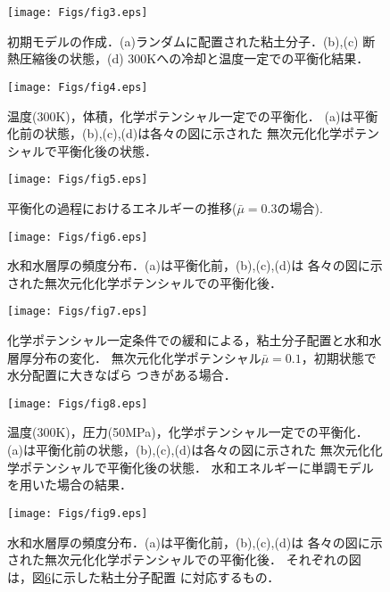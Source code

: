 \begin{figure}[h]
	\begin{center}
	\texttt{[image: Figs/fig3.eps]} 
	\end{center}
	\caption{
		初期モデルの作成．(a)ランダムに配置された粘土分子．(b),(c) 断熱圧縮後の状態，(d)
		300Kへの冷却と温度一定での平衡化結果．
	} 
	\label{fig:fig3}
\end{figure}
\begin{figure}[h]
	\begin{center}
	\texttt{[image: Figs/fig4.eps]} 
	\end{center}
	\caption{
		温度(300K)，体積，化学ポテンシャル一定での平衡化．
		(a)は平衡化前の状態，(b),(c),(d)は各々の図に示された
		無次元化化学ポテンシャルで平衡化後の状態．
	} 
	\label{fig:fig4}
\end{figure}
\begin{figure}[h]
	\begin{center}
	\texttt{[image: Figs/fig5.eps]} 
	\end{center}
	\caption{
		平衡化の過程におけるエネルギーの推移($\bar{\mu}=0.3の場合$).
	} 
	\label{fig:fig5}
\end{figure}
\begin{figure}[h]
	\begin{center}
	\texttt{[image: Figs/fig6.eps]} 
	\end{center}
	\caption{
		水和水層厚の頻度分布．(a)は平衡化前，(b),(c),(d)は
		各々の図に示された無次元化化学ポテンシャルでの平衡化後．
	} 
	\label{fig:fig6}
\end{figure}
\begin{figure}[h]
	\begin{center}
	\texttt{[image: Figs/fig7.eps]} 
	\end{center}
	\caption{
		化学ポテンシャル一定条件での緩和による，粘土分子配置と水和水層厚分布の変化．
		無次元化化学ポテンシャル$\bar{\mu}=0.1$，初期状態で水分配置に大きなばら
		つきがある場合．
	} 
	\label{fig:fig7}
\end{figure}
\begin{figure}[h]
	\begin{center}
	\texttt{[image: Figs/fig8.eps]} 
	\end{center}
	\caption{
		温度(300K)，圧力(50MPa)，化学ポテンシャル一定での平衡化．
		(a)は平衡化前の状態，(b),(c),(d)は各々の図に示された
		無次元化化学ポテンシャルで平衡化後の状態．
		水和エネルギーに単調モデルを用いた場合の結果．
	} 
	\label{fig:fig8}
\end{figure}
\begin{figure}[h]
	\begin{center}
	\texttt{[image: Figs/fig9.eps]} 
	\end{center}
	\caption{
		水和水層厚の頻度分布．(a)は平衡化前，(b),(c),(d)は
		各々の図に示された無次元化化学ポテンシャルでの平衡化後．
		それぞれの図は，図\ref{fig:fig8}に示した粘土分子配置
		に対応するもの．
	} 
	\label{fig:fig9}
\end{figure}
